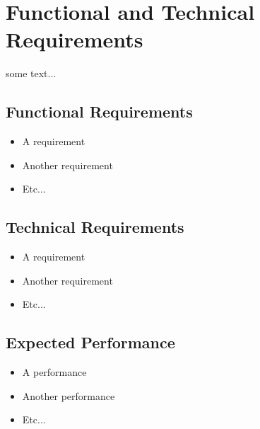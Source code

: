 \section{Functional and Technical Requirements}
\label{sec:requirements}

some text...

\subsection{Functional Requirements}

\begin{itemize}
\item A requirement
\item Another requirement
\item Etc...
\end{itemize}


\subsection{Technical Requirements}

\begin{itemize}
\item A requirement
\item Another requirement
\item Etc...
\end{itemize}


\subsection{Expected Performance}

\begin{itemize}
\item A performance
\item Another performance
\item Etc...
\end{itemize}

